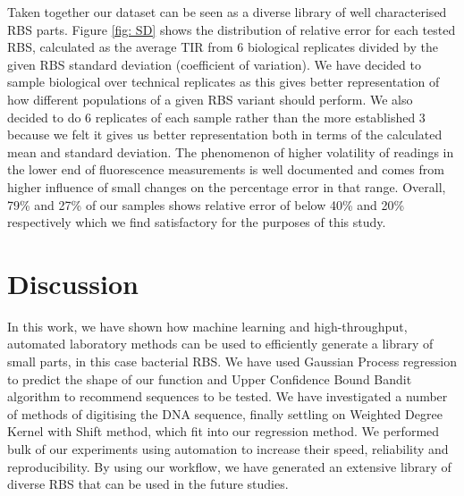 \documentclass{article}
\begin{document}
Taken together our dataset can be seen as a diverse library of well characterised RBS parts.
Figure \ref{fig: SD} shows the distribution of relative error for each tested RBS, calculated as the average TIR from 6 biological replicates divided by the given RBS standard deviation (coefficient of variation).
We have decided to sample biological over technical replicates as this gives better representation of how different populations of a given RBS variant should perform.
We also decided to do 6 replicates of each sample rather than the more established 3 because we felt it gives us better representation both in terms of the calculated mean and standard deviation.
The phenomenon of higher volatility of readings in the lower end of fluorescence measurements is well documented and comes from higher influence of small changes on the percentage error in that range.
Overall, 79\% and 27\% of our samples shows relative error of below 40\% and 20\% respectively which we find satisfactory for the purposes of this study.

\section{Discussion}

In this work, we have shown how machine learning and high-throughput, automated laboratory methods can be used to efficiently generate a library of small parts, in this case bacterial RBS. 
We have used Gaussian Process regression to predict the shape of our function and Upper Confidence Bound Bandit algorithm to recommend sequences to be tested.
We have investigated a number of methods of digitising the DNA sequence, finally settling on Weighted Degree Kernel with Shift method, which fit into our regression method.
We performed bulk of our experiments using automation to increase their speed, reliability and reproducibility.
By using our workflow, we have generated an extensive library of diverse RBS that can be used in the future studies.\\
\end{document}
